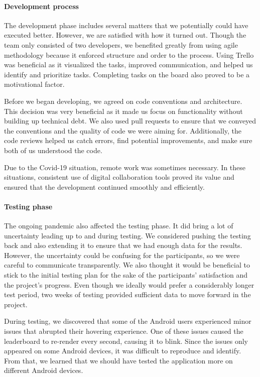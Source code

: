 \paragraph*{Development process}
The development phase includes several matters that we potentially could have executed better. However, we are satisfied with how it turned out. Though the team only consisted of two developers, we benefited greatly from using agile methodology because it enforced structure and order to the process. Using Trello was beneficial as it visualized the tasks, improved communication, and helped us identify and prioritize tasks. Completing tasks on the board also proved to be a motivational factor. 

Before we began developing, we agreed on code conventions and architecture. This decision was very beneficial as it made us focus on functionality without building up technical debt. We also used pull requests to ensure that we conveyed the conventions and the quality of code we were aiming for. Additionally, the code reviews helped us catch errors, find potential improvements, and make sure both of us understood the code.

Due to the Covid-19 situation, remote work was sometimes necessary. In these situations, consistent use of digital collaboration tools proved its value and ensured that the development continued smoothly and efficiently.

\paragraph*{Testing phase}
The ongoing pandemic also affected the testing phase. It did bring a lot of uncertainty leading up to and during testing. We considered pushing the testing back and also extending it to ensure that we had enough data for the results. However, the uncertainty could be confusing for the participants, so we were careful to communicate transparently. We also thought it would be beneficial to stick to the initial testing plan for the sake of the participants’ satisfaction and the project’s progress. Even though we ideally would prefer a considerably longer test period, two weeks of testing provided sufficient data to move forward in the project. 

During testing, we discovered that some of the Android users experienced minor issues that abrupted their hovering experience. One of these issues caused the leaderboard to re-render every second, causing it to blink. Since the issues only appeared on some Android devices, it was difficult to reproduce and identify. From that, we learned that we should have tested the application more on different Android devices. 

